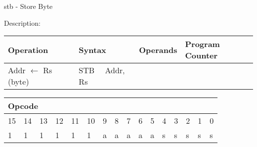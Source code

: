 \documentclass{article}
\begin{document}
\bigskip

stb - Store Byte

Description:

\begin{tabular}{|l|l|l|l|}
\hline
Operation & Syntax & Operands & Program Counter \\ \hline
Addr $\leftarrow $ Rs (byte) & STB \ \ Addr, Rs &  &  \\ \hline
\end{tabular}

\begin{tabular}{|c|c|c|c|c|c|c|c|c|c|c|c|c|c|c|c|}
\hline
\multicolumn{6}{|l|}{Opcode} & \multicolumn{5}{|l|}{} & \multicolumn{5}{|l|}{
} \\ \hline
15 & 14 & 13 & 12 & 11 & 10 & 9 & 8 & 7 & 6 & 5 & 4 & 3 & 2 & 1 & 0 \\ \hline
\multicolumn{1}{|l|}{1} & \multicolumn{1}{|l|}{1} & \multicolumn{1}{|l|}{1}
& \multicolumn{1}{|l|}{1} & \multicolumn{1}{|l|}{1} & \multicolumn{1}{|l|}{1}
& \multicolumn{1}{|l|}{a} & \multicolumn{1}{|l|}{a} & \multicolumn{1}{|l|}{a}
& \multicolumn{1}{|l|}{a} & \multicolumn{1}{|l|}{a} & \multicolumn{1}{|l|}{s}
& \multicolumn{1}{|l|}{s} & \multicolumn{1}{|l|}{s} & \multicolumn{1}{|l|}{s}
& \multicolumn{1}{|l|}{s} \\ \hline
\end{tabular}

\bigskip
\end{document}
